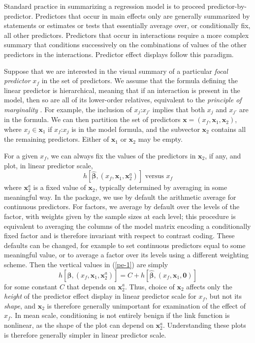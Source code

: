 \documentclass[article]{jss}
\newcommand{\x}{\mathbf{x}}
\newcommand{\bbetahat}{\widehat{\boldsymbol{\beta}}}
\newcommand{\inter}[2]{\mbox{$#1$:$#2$}}
\begin{document}
Standard practice in summarizing a regression model is to proceed predictor-by-predictor.  Predictors that occur in main effects only are generally summarized by statements or estimates or tests that essentially average over, or conditionally fix, all other predictors.  Predictors that occur in interactions require a more complex summary that conditions successively on the combinations of values of the other predictors in the interactions. Predictor effect displays follow this paradigm.

Suppose that we are interested in the visual summary of a particular \emph{focal predictor} $x_f$ in the set of predictors. We assume that the formula defining the linear predictor is hierarchical, meaning that if an interaction is present in the model, then so are all of its lower-order relatives, equivalent to the \emph{principle of marginality} \citep{Nelder77}. For example, the inclusion of $\inter{x_j}{x_{j'}}$ implies that both $x_j$ and $x_{j'}$ are in the formula.  We can then partition the set of predictors $\x = (x_f, \x_1, \x_2)$, where  $x_j \in \x_{1}$ if $\inter{x_f}{x_j}$ is in the model formula, and the subvector $\x_2$ contains all the remaining predictors.  Either of $\x_1$ or $\x_2$ may be empty.

For a given $x_f$, we can always fix the values of the predictors in $\x_2$, if any, and plot, in linear predictor scale,
\begin{equation}
h\left[\bbetahat, (x_f, \x_1, \x_2^a)\right]  \textrm{ versus } x_{f} \label{pe-1}
\end{equation}
where $\x_2^a$ is a fixed value of $\x_2$, typically determined by averaging in some meaningful way.  In the  package, we use by default the arithmetic average for continuous predictors. For factors, we average by default over the levels of the factor, with weights given by the sample sizes at each level; this procedure is equivalent to averaging the columns of the model matrix encoding a conditionally fixed factor and is therefore invariant with respect to contrast coding.  These defaults can be changed, for example to set continuous predictors equal to some meaningful value, or to average a factor over its levels using a different weighting scheme.  Then the vertical values in (\ref{pe-1})  are simply
\begin{equation}
h\left[\bbetahat, (x_f, \x_1, \x_2^a)\right] = C + h\left[\bbetahat, (x_f, \x_1, \mathbf{0})\right]\label{pe-1a}
\end{equation}
for some constant $C$ that depends on $\x_2^a$.  Thus, choice of $\x_2$ affects only the \emph{height} of the predictor effect display in linear predictor scale for $x_f$, but not its \emph{shape}, and $\x_2$ is therefore generally unimportant for examination of the effect of $x_f$.  In mean scale, conditioning is not entirely benign if the link function is nonlinear, as the shape of the plot can depend on $\x_2^a$.  Understanding these plots is therefore generally simpler in linear predictor scale.
\end{document}
